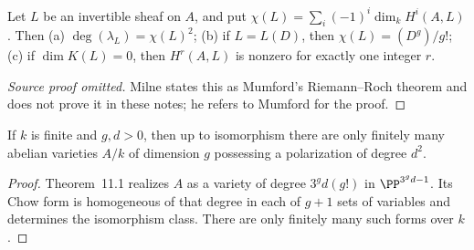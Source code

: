\begin{theorem}\label{thm:milne-polarization-riemann-roch}
Let $L$ be an invertible sheaf on $A$, and put $\chi(L)=\sum_i(-1)^i\dim_kH^i(A,L)$. Then (a) $\deg(\lambda_L)=\chi(L)^2$; (b) if $L=L(D)$, then $\chi(L)=(D^g)/g!$; (c) if $\dim K(L)=0$, then $H^r(A,L)$ is nonzero for exactly one integer $r$.
\end{theorem}

\begin{proof}[Source proof omitted]
Milne states this as Mumford's Riemann--Roch theorem and does not prove it in
these notes; he refers to Mumford for the proof.
\end{proof}

\begin{theorem}\label{thm:milne-polarization-finiteness}
If $k$ is finite and $g,d>0$, then up to isomorphism there are only finitely many abelian varieties $A/k$ of dimension $g$ possessing a polarization of degree $d^2$.
\end{theorem}

\begin{proof}

Theorem~11.1 realizes $A$ as a variety of degree $3^gd(g!)$ in $\PP^{3^gd-1}$. Its Chow form is homogeneous of that degree in each of $g+1$ sets of variables and determines the isomorphism class. There are only finitely many such forms over $k$.

\end{proof}


